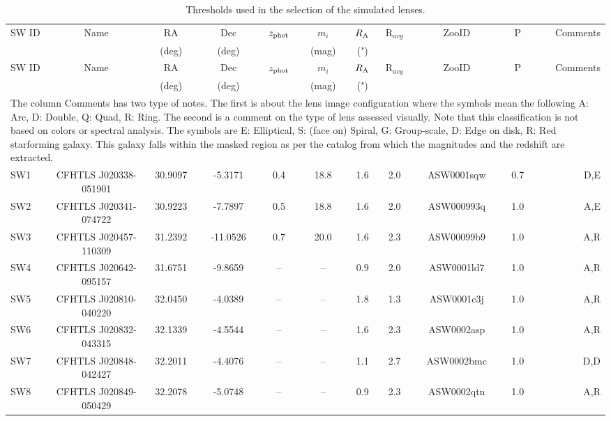 \documentclass[useAMS,usenatbib,a4paper]{mn2e}
\begin{document}
\begin{center}
\begin{longtable}{lcccccccccr}
\caption{ \label{tab:swcands} 
Thresholds used in the selection of the simulated lenses. }\\
\hline
SW ID & Name & RA & Dec &  $z_{\rm phot}$ & $m_i$ & $R_{\rm A}$ & R$_{avg}$ & ZooID & P & Comments  \\
  &  & (deg) & (deg) &  & (mag) &  (") &  &  & & \\ 
\hline
\endfirsthead
\hline
SW ID & Name & RA & Dec &  $z_{\rm phot}$ & $m_i$ & $R_{\rm A}$ & R$_{avg}$ & ZooID & P & Comments  \\
  &  & (deg) & (deg) &  & (mag) &  (") &  &  & & \\ 
\hline
\endhead
\hline
\multicolumn{11}{p{18cm}}{
The column Comments has two type of notes. The first is about the lens
image configuration where the symbols mean the following A: Arc, D: Double, Q:
Quad, R: Ring. The second is a comment on the type of lens assessed
visually. Note that this classification is not based on colors or spectral
analysis. The symbols are E: Elliptical, S: (face on) Spiral, G: Group-scale, D:
Edge on disk, R: Red starforming galaxy.  This galaxy falls within the masked region as per the catalog from
which the magnitudes and the redshift are extracted.  
}\\  
\endlastfoot
 SW1 & CFHTLS J020338-051901 &   30.9097 &   -5.3171 &  0.4 & 18.8 &  1.6 &  2.0 & ASW0001sqw &  0.7  &  D,E   \\ 
 SW2 & CFHTLS J020341-074722 &   30.9223 &   -7.7897 &  0.5 & 18.8 &  1.6 &  2.0 & ASW000993q &  1.0  &  A,E   \\ 
 SW3 & CFHTLS J020457-110309 &   31.2392 &  -11.0526 &  0.7 & 20.0 &  1.6 &  2.3 & ASW00099b9 &  1.0  &  A,R   \\ 
 SW4 & CFHTLS J020642-095157 &   31.6751 &   -9.8659 &  --  &  --  &  0.9 &  2.0 & ASW0001ld7 &  1.0  &  A,R   \\ 
 SW5 & CFHTLS J020810-040220 &   32.0450 &   -4.0389 &  --  &  --  &  1.8 &  1.3 & ASW0001c3j &  1.0  &  A,R   \\ 
 SW6 & CFHTLS J020832-043315 &   32.1339 &   -4.5544 &  --  &  --  &  1.6 &  2.3 & ASW0002asp &  1.0  &  A,R   \\ 
 SW7 & CFHTLS J020848-042427 &   32.2011 &   -4.4076 &  --  &  --  &  1.1 &  2.7 & ASW0002bmc &  1.0  &  D,D   \\ 
 SW8 & CFHTLS J020849-050429 &   32.2078 &   -5.0748 &  --  &  --  &  0.9 &  2.3 & ASW0002qtn &  1.0  &  A,R   \\ 

\end{longtable}
\end{center}
\end{document}
